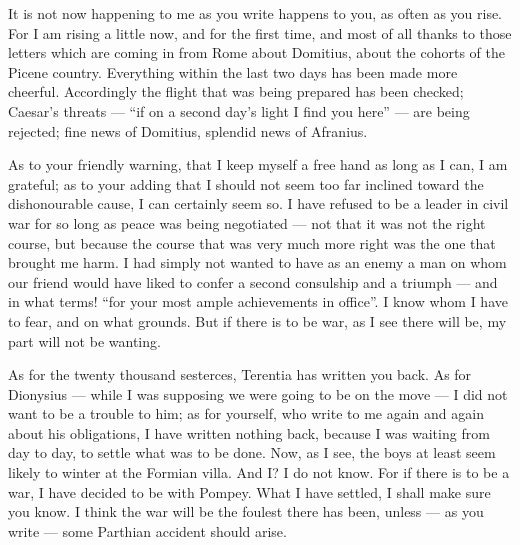 

 It is not now happening to me as you write happens to you, as often as you rise. For I am rising a little now, and for the first time, and most of all thanks to those letters which are coming in from Rome about Domitius, about the cohorts of the Picene country. Everything within the last two days has been made more cheerful. Accordingly the flight that was being prepared has been checked; Caesar's threats --- ``if on a second day's light I find you here'' --- are being rejected; fine news of Domitius, splendid news of Afranius.

 As to your friendly warning, that I keep myself a free hand as long as I can, I am grateful; as to your adding that I should not seem too far inclined toward the dishonourable cause, I can certainly seem so. I have refused to be a leader in civil war for so long as peace was being negotiated --- not that it was not the right course, but because the course that was very much more right was the one that brought me harm. I had simply not wanted to have as an enemy a man on whom our friend would have liked to confer a second consulship and a triumph --- and in what terms! ``for your most ample achievements in office''. I know whom I have to fear, and on what grounds. But if there is to be war, as I see there will be, my part will not be wanting.

 As for the twenty thousand sesterces, Terentia has written you back. As for Dionysius --- while I was supposing we were going to be on the move --- I did not want to be a trouble to him; as for yourself, who write to me again and again about his obligations, I have written nothing back, because I was waiting from day to day, to settle what was to be done. Now, as I see, the boys at least seem likely to winter at the Formian villa. And I? I do not know. For if there is to be a war, I have decided to be with Pompey. What I have settled, I shall make sure you know. I think the war will be the foulest there has been, unless --- as you write --- some Parthian accident should arise.
